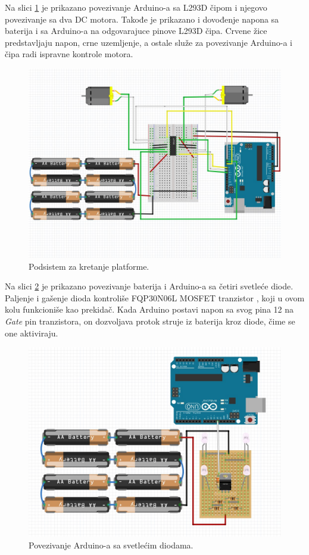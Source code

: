\documentclass[12pt,a4paper]{report}
\begin{document}
Na slici \ref{fig:motors} je prikazano povezivanje Arduino-a sa L293D čipom i njegovo povezivanje sa dva DC motora. Takođe je prikazano i dovođenje napona sa baterija i sa Arduino-a na odgovarajuce pinove L293D čipa. Crvene žice predstavljaju napon, crne uzemljenje, a ostale služe za povezivanje Arduino-a i čipa radi ispravne kontrole motora.

\begin{figure}[H]
    \centering
    \includegraphics[scale=0.41]{img/motors.jpg}
    \caption{Podsistem za kretanje platforme.}
    \label{fig:motors}
\end{figure}

Na slici \ref{fig:lights} je prikazano povezivanje baterija i Arduino-a sa četiri svetleće diode. Paljenje i gašenje dioda kontroliše FQP30N06L MOSFET tranzistor \cite{mosfet}, koji u ovom kolu funkcioniše kao prekidač. Kada Arduino postavi napon sa svog pina 12 na \textit{Gate} pin tranzistora, on dozvoljava protok struje iz baterija kroz diode, čime se one aktiviraju. 

\begin{figure}[H]
    \centering
    \includegraphics[scale=0.41]{img/lights.jpg}
    \caption{Povezivanje Arduino-a sa svetlećim diodama.}
    \label{fig:lights}
\end{figure}
\end{document}
